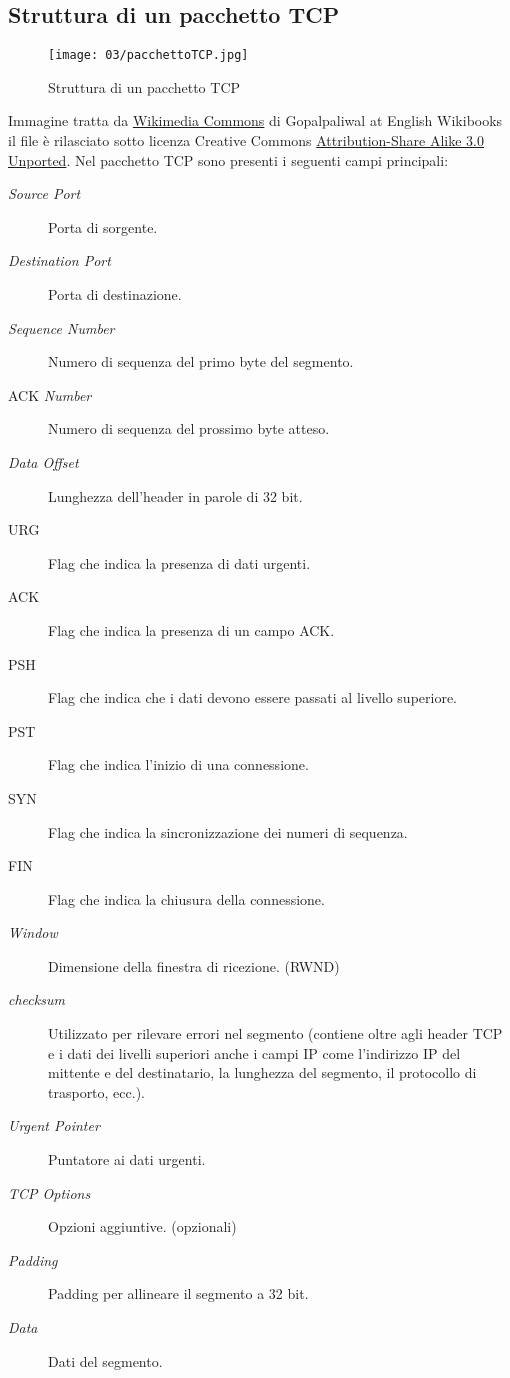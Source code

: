     \subsection[Struttura di un pacchetto \texttt{TCP}]{Struttura di un pacchetto \Acrshort*{TCP}}
        \begin{figure}[H]
            \centering
            \texttt{[image: 03/pacchettoTCP.jpg]}
            \caption{Struttura di un pacchetto \Acrshort*{TCP} } 
        \end{figure}
        {\footnotesize Immagine tratta da \href{https://commons.wikimedia.org/wiki/File:Ntwk_tcp_header.jpg}{Wikimedia Commons} di Gopalpaliwal at English Wikibooks il file è rilasciato sotto licenza Creative Commons \href{https://creativecommons.org/licenses/by-sa/3.0/deed.en}{Attribution-Share Alike 3.0 Unported}.}
        Nel pacchetto \Acrshort*{TCP} sono presenti i seguenti campi principali:
        \begin{description}
            \item[\textit{Source Port}] Porta di sorgente.
            \item[\textit{Destination Port}] Porta di destinazione.
            \item[\textit{Sequence Number}] Numero di sequenza del primo byte del segmento.
            \item[\Acrlong*{ACK} \textit{Number}] Numero di sequenza del prossimo byte atteso.
            \item[\textit{Data Offset}] Lunghezza dell'header in parole di 32 bit.
            \item[\Acrshort*{URG}] Flag che indica la presenza di dati urgenti.
            \item[\Acrshort*{ACK}] Flag che indica la presenza di un campo \Acrshort*{ACK}.
            \item[\Acrshort*{PSH}] Flag che indica che i dati devono essere passati al livello superiore.
            \item[\Acrshort*{PST}] Flag che indica l'inizio di una connessione.
            \item[\Acrshort*{SYN}] Flag che indica la sincronizzazione dei numeri di sequenza.
            \item[\Acrshort*{FIN}] Flag che indica la chiusura della connessione.
            \item[\textit{Window}] Dimensione della finestra di ricezione. (\Acrshort*{RWND})
            \item[\textit{checksum}] Utilizzato per rilevare errori nel segmento (contiene oltre agli header \Acrshort*{TCP} e i dati dei livelli superiori anche i campi \Acrshort*{IP} come l'indirizzo \Acrshort*{IP} del mittente e del destinatario, la lunghezza del segmento, il protocollo di trasporto, ecc.).
            \item[\textit{Urgent Pointer}] Puntatore ai dati urgenti.
            \item[\textit{\Acrshort*{TCP} Options}] Opzioni aggiuntive. (opzionali)
            \item[\textit{Padding}] Padding per allineare il segmento a 32 bit.
            \item[\textit{Data}] Dati del segmento.
        \end{description}
